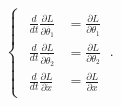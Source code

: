 \documentclass[convert={outfile=\jobname.svg}]{standalone}
\begin{document}
$
    \begin{cases}
        \begin{aligned}
            \displaystyle\frac{d}{dt}\frac{\partial L}{\partial \dot{\theta_1}} & = \frac{\partial L}{\partial \theta_1} \\
            \displaystyle\frac{d}{dt}\frac{\partial L}{\partial \dot{\theta_2}} & = \frac{\partial L}{\partial \theta_2} \\
            \displaystyle\frac{d}{dt}\frac{\partial L}{\partial \dot{x}}        & = \frac{\partial L}{\partial x}
        \end{aligned}\ .
    \end{cases}
$
\end{document}
